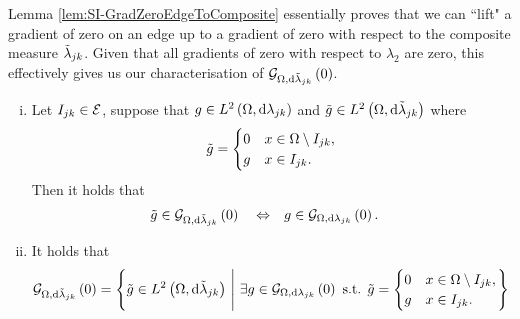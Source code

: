 Lemma \ref{lem:SI-GradZeroEdgeToComposite} essentially proves that we can ``lift" a gradient of zero on an edge up to a gradient of zero with respect to the composite measure $\tilde{\lambda}_{jk}$.
Given that all gradients of zero with respect to $\lambda_2$ are zero, this effectively gives us our characterisation of $\mathcal{G}_{ \Omega, \mathrm{d}\tilde{\lambda}_{jk}}\left( 0 \right)$.
\begin{cory} \label{cory:SI-GradZeroEdgeChar}
	\begin{enumerate}[(i)]
		\item Let $I_{jk}\in\mathcal{E}$, suppose that $g\in L^{2}\left( \Omega,\mathrm{d}\lambda_{jk} \right)$ and $\tilde{g}\in L^{2}\left( \Omega,\mathrm{d}\tilde{\lambda}_{jk} \right)$ where
		\begin{align*}
			\tilde{g} = \begin{cases} 0 & x\in\Omega\setminus I_{jk}, \\ g & x\in I_{jk}. \end{cases}
		\end{align*}
		Then it holds that
		\begin{align*}
			\tilde{g}\in\mathcal{G}_{ \Omega, \mathrm{d}\tilde{\lambda}_{jk}}\left( 0 \right) \quad\Leftrightarrow\quad 
			& g\in\mathcal{G}_{ \Omega, \mathrm{d}\lambda_{jk}}\left( 0 \right).
		\end{align*}
		\item It holds that
		\begin{align*}
			\mathcal{G}_{ \Omega, \mathrm{d}\tilde{\lambda}_{jk}}\left( 0 \right) 
			&= \left\{  \tilde{g}\in L^{2}\left( \Omega,\mathrm{d}\tilde{\lambda}_{jk} \right) \ \middle\vert \  \exists g\in\mathcal{G}_{ \Omega, \mathrm{d}\lambda_{jk}}\left( 0 \right) \text{ s.t. } \tilde{g} = \begin{cases} 0 & x\in\Omega\setminus I_{jk}, \\ g & x\in I_{jk}. \end{cases} \right\}
		\end{align*}
	\end{enumerate}
\end{cory}
